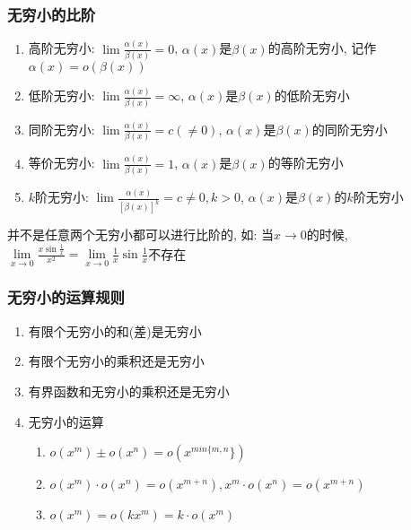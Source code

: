 \subsubsection{无穷小的比阶}\label{无穷小的比阶}
\begin{enumerate}
\item 高阶无穷小: $ \lim\limits \frac{\alpha(x)}{\beta(x)}=0 $, $ \alpha(x) $是$ \beta(x) $的高阶无穷小, 记作$ \alpha(x)=o(\beta(x)) $
\item 低阶无穷小: $ \lim\limits \frac{\alpha(x)}{\beta(x)}=\infty $, $ \alpha(x) $是$ \beta(x) $的低阶无穷小
\item 同阶无穷小: $ \lim\limits \frac{\alpha(x)}{\beta(x)}=c(\neq 0) $, $ \alpha(x) $是$ \beta(x) $的同阶无穷小
\item 等价无穷小: $ \lim\limits \frac{\alpha(x)}{\beta(x)}=1 $, $ \alpha(x) $是$ \beta(x) $的等阶无穷小
\item $ k $阶无穷小: $ \lim\limits \frac{\alpha(x)}{[\beta(x)]^{k}}=c\neq 0, k>0 $, $ \alpha(x) $是$ \beta(x) $的$ k $阶无穷小
\end{enumerate}
\begin{tcolorbox}
并不是任意两个无穷小都可以进行比阶的, 如: 当$ x \rightarrow 0 $的时候, $ \lim\limits_{x\rightarrow 0}\frac{x\sin \frac{1}{x}}{x^{2}}=\lim\limits_{x\rightarrow 0}\frac{1}{x}\sin \frac{1}{x} $不存在
\end{tcolorbox}
\subsubsection{无穷小的运算规则}
\begin{enumerate}
\item 有限个无穷小的和(差)是无穷小
\item 有限个无穷小的乘积还是无穷小
\item 有界函数和无穷小的乘积还是无穷小
\item 无穷小的运算 \par 
\begin{enumerate}
\item $ o(x^{m})\pm o(x^{n})=o(x^{min\{m,n}\}) $
\item $ o(x^{m})\cdot o(x^{n})=o(x^{m+n}), x^{m}\cdot o(x^{n})=o(x^{m+n}) $
\item $ o(x^{m})=o(kx^{m})=k\cdot o(x^{m}) $
\end{enumerate}
\end{enumerate}

